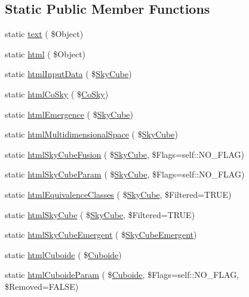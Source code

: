 \subsection*{Static Public Member Functions}
\begin{DoxyCompactItemize}
\item 
static \hyperlink{class_s_k_display_a890c2827ea7d0ce8f9ec3e8cc56e9ccf}{text} ( \$Object)
\item 
static \hyperlink{class_s_k_display_af34871f9eb4bf1b47200f631babade40}{html} ( \$Object)
\item 
static \hyperlink{class_s_k_display_a747b571c4ef0f6d421fad02761eab956}{html\+Input\+Data} ( \$\hyperlink{class_sky_cube}{Sky\+Cube})
\item 
static \hyperlink{class_s_k_display_a300475659a3435d38f6dc5c5ee8b5643}{html\+Co\+Sky} ( \$\hyperlink{class_co_sky}{Co\+Sky})
\item 
static \hyperlink{class_s_k_display_a5bc7ad49030fe6da158b2dec6af00055}{html\+Emergence} ( \$\hyperlink{class_sky_cube}{Sky\+Cube})
\item 
static \hyperlink{class_s_k_display_a9623f5a50f0b3e2cbba59d01c43c7538}{html\+Multidimensional\+Space} ( \$\hyperlink{class_sky_cube}{Sky\+Cube})
\item 
static \hyperlink{class_s_k_display_aae2627b2f50d1b58bfb0d5b7665360b0}{html\+Sky\+Cube\+Fusion} ( \$\hyperlink{class_sky_cube}{Sky\+Cube}, \$Flags=self\+::\+N\+O\+\_\+\+F\+L\+AG)
\item 
static \hyperlink{class_s_k_display_ab96b44bd3c524806f555c15ee67182cf}{html\+Sky\+Cube\+Param} ( \$\hyperlink{class_sky_cube}{Sky\+Cube}, \$Flags=self\+::\+N\+O\+\_\+\+F\+L\+AG)
\item 
static \hyperlink{class_s_k_display_a293dfd4824149602bf52e548f837ea99}{html\+Equivalence\+Classes} ( \$\hyperlink{class_sky_cube}{Sky\+Cube}, \$Filtered=T\+R\+UE)
\item 
static \hyperlink{class_s_k_display_a9df9c903092bb2ba401959b62c740a2d}{html\+Sky\+Cube} ( \$\hyperlink{class_sky_cube}{Sky\+Cube}, \$Filtered=T\+R\+UE)
\item 
static \hyperlink{class_s_k_display_a14e07320ee77ed55eff754b554411762}{html\+Sky\+Cube\+Emergent} ( \$\hyperlink{class_sky_cube_emergent}{Sky\+Cube\+Emergent})
\item 
static \hyperlink{class_s_k_display_a9a8e373b3aec7d3cbb8ce82b0a2b8b31}{html\+Cuboide} ( \$\hyperlink{class_cuboide}{Cuboide})
\item 
static \hyperlink{class_s_k_display_afbb7c464ea747fd73da2cd839a6ce1bc}{html\+Cuboide\+Param} ( \$\hyperlink{class_cuboide}{Cuboide}, \$Flags=self\+::\+N\+O\+\_\+\+F\+L\+AG, \$Removed=F\+A\+L\+SE)

\end{DoxyCompactItemize}

